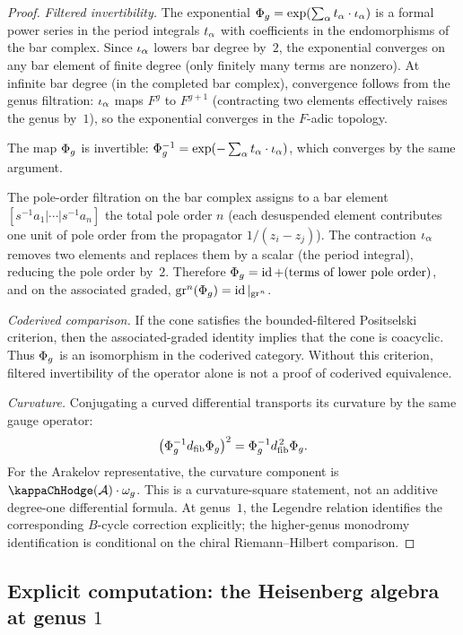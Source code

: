 \begin{proof}
\emph{Filtered invertibility.} The exponential
$\Phi_g = \exp(\sum_\alpha t_\alpha \cdot \iota_\alpha)$
is a formal power series in the period integrals $t_\alpha$ with
coefficients in the endomorphisms of the bar complex.
Since $\iota_\alpha$ lowers bar degree by~$2$, the exponential
converges on any bar element of finite degree (only finitely
many terms are nonzero). At infinite bar degree (in the
completed bar complex), convergence follows from the genus
filtration: $\iota_\alpha$ maps $F^g$ to $F^{g+1}$ (contracting
two elements effectively raises the genus by~$1$), so the
exponential converges in the $F$-adic topology.

The map $\Phi_g$ is invertible: $\Phi_g^{-1} =
\exp(-\sum_\alpha t_\alpha \cdot \iota_\alpha)$, which converges
by the same argument.

The pole-order filtration on the bar complex assigns to
a bar element $[s^{-1}a_1 | \cdots | s^{-1}a_n]$ the
total pole order $n$ (each desuspended element contributes one
unit of pole order from the propagator $1/(z_i - z_j)$).
The contraction $\iota_\alpha$ removes two elements and replaces
them by a scalar (the period integral), reducing the pole
order by~$2$. Therefore $\Phi_g = \operatorname{id} + (\text{terms of lower
pole order})$, and on the associated graded,
$\mathrm{gr}^n(\Phi_g) = \operatorname{id}|_{\mathrm{gr}^n}$.

\smallskip
\emph{Coderived comparison.}
If the cone satisfies the bounded-filtered Positselski criterion,
then the associated-graded identity implies that the cone is
coacyclic. Thus $\Phi_g$ is an isomorphism in the coderived
category. Without this criterion, filtered invertibility of the
operator alone is not a proof of coderived equivalence.

\smallskip
\emph{Curvature.}
Conjugating a curved differential transports its curvature by
the same gauge operator:
\[
\bigl(\Phi_g^{-1}d_{\mathrm{fib}}\Phi_g\bigr)^2
=
\Phi_g^{-1}d_{\mathrm{fib}}^{\,2}\Phi_g.
\]
For the Arakelov representative, the curvature component is
$\kappaChHodge(\cA)\cdot\omega_g$. This is a curvature-square
statement, not an additive degree-one differential formula. At
genus~$1$, the Legendre relation identifies the corresponding
$B$-cycle correction explicitly; the higher-genus monodromy
identification is conditional on the chiral Riemann--Hilbert
comparison.
\end{proof}

\subsection{Explicit computation: the Heisenberg algebra
at genus $1$}
\label{subsec:chiral-exp-heisenberg}

